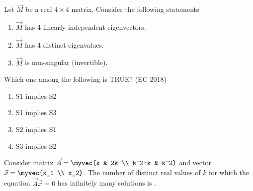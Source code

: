\item Let $\vec{M}$ be a real $4 \times 4$ matrix. Consider the following statements
	\begin{enumerate}[label=S\arabic*:]
		\item $\vec{M}$ has 4 linearly independent eigenvectors.
		\item $\vec{M}$ has 4 distinct eigenvalues.
		\item $\vec{M}$ is non-singular (invertible).
\end{enumerate}
Which one among the following is TRUE?
\hfill(EC 2018)
\begin{multicols}{4}
\begin{enumerate}
\item S1 implies S2
\item S1 implies S3
\item S2 implies S1
\item S3 implies S2
\end{enumerate}
\end{multicols}
    \item Consider matrix $\vec{A} = \myvec{k & 2k \\ k^2-k & k^2}$ and vector $\vec{x} = \myvec{x_1 \\ x_2}$. The number of distinct real values of $k$ for which the equation $\vec{A}\vec{x}=0$ has infinitely many solutions is \underline{\hspace{2cm}}.
    \hfill{}

